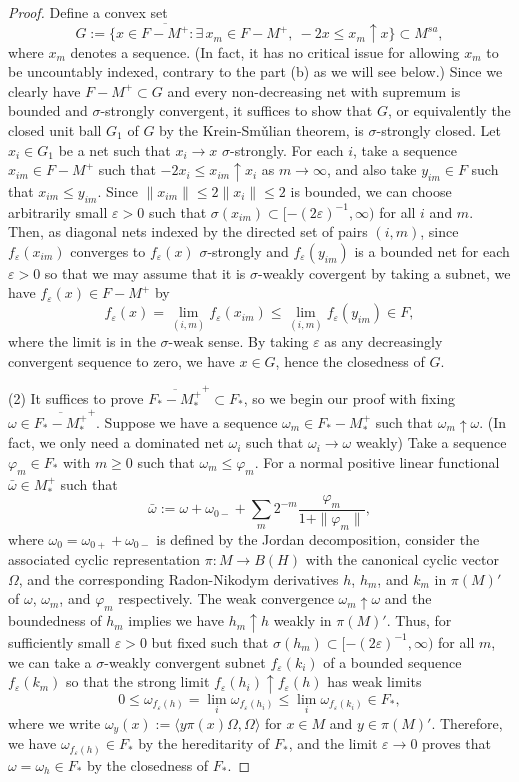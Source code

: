 \documentclass[a4paper]{amsart}
\newcommand{\e}{\varepsilon}
\theoremstyle{plain}
\theoremstyle{definition}
\begin{document}
\begin{proof}
Define a convex set
\[G:=\{x\in\overline{F-M^+}:\exists\,x_m\in F-M^+,\ -2x\le x_m\uparrow x\}\subset M^{sa},\]
where $x_m$ denotes a sequence.
(In fact, it has no critical issue for allowing $x_m$ to be uncountably indexed, contrary to the part (b) as we will see below.)
Since we clearly have $F-M^+\subset G$ and every non-decreasing net with supremum is bounded and $\sigma$-strongly convergent, it suffices to show that $G$, or equivalently the closed unit ball $G_1$ of $G$ by the Krein-Sm\v ulian theorem, is $\sigma$-strongly closed.
Let $x_i\in G_1$ be a net such that $x_i\to x$ $\sigma$-strongly.
For each $i$, take a sequence $x_{im}\in F-M^+$ such that $-2x_i\le x_{im}\uparrow x_i$ as $m\to\infty$, and also take $y_{im}\in F$ such that $x_{im}\le y_{im}$.
Since $\|x_{im}\|\le2\|x_i\|\le2$ is bounded, we can choose arbitrarily small $\e>0$ such that $\sigma(x_{im})\subset[-(2\e)^{-1},\infty)$ for all $i$ and $m$.
Then, as diagonal nets indexed by the directed set of pairs $(i,m)$, since $f_\e(x_{im})$ converges to $f_\e(x)$ $\sigma$-strongly and $f_\e(y_{im})$ is a bounded net for each $\e>0$ so that we may assume that it is $\sigma$-weakly covergent by taking a subnet, we have $f_\e(x)\in F-M^+$ by
\[f_\e(x)=\lim_{(i,m)}f_\e(x_{im})\le\lim_{(i,m)}f_\e(y_{im})\in F,\]
where the limit is in the $\sigma$-weak sense.
By taking $\e$ as any decreasingly convergent sequence to zero, we have $x\in G$, hence the closedness of $G$.


(2)
It suffices to prove $\overline{F_*-M_*^+}^+\subset F_*$, so we begin our proof with fixing $\omega\in\overline{F_*-M_*^+}^+$.
Suppose we have a sequence $\omega_m\in F_*-M_*^+$ such that $\omega_m\uparrow\omega$. (In fact, we only need a dominated net $\omega_i$ such that $\omega_i\to\omega$ weakly)
Take a sequence $\varphi_m\in F_*$ with $m\ge0$ such that $\omega_m\le\varphi_m$.
For a normal positive linear functional $\bar\omega\in M_*^+$ such that
\[\bar\omega:=\omega+\omega_{0-}+\sum_m2^{-m}\frac{\varphi_m}{1+\|\varphi_m\|},\]
where $\omega_0=\omega_{0+}+\omega_{0-}$ is defined by the Jordan decomposition, consider the associated cyclic representation $\pi:M\to B(H)$ with the canonical cyclic vector $\Omega$, and the corresponding Radon-Nikodym derivatives $h$, $h_m$, and $k_m$ in $\pi(M)'$ of $\omega$, $\omega_m$, and $\varphi_m$ respectively.
The weak convergence $\omega_m\uparrow\omega$ and the boundedness of $h_m$ implies we have $h_m\uparrow h$ weakly in $\pi(M)'$.
Thus, for sufficiently small $\e>0$ but fixed such that $\sigma(h_m)\subset[-(2\e)^{-1},\infty)$ for all $m$, we can take a $\sigma$-weakly convergent subnet $f_\e(k_i)$ of a bounded sequence $f_\e(k_m)$ so that the strong limit $f_\e(h_i)\uparrow f_\e(h)$ has weak limits
\[0\le\omega_{f_\e(h)}=\lim_i\omega_{f_\e(h_i)}\le\lim_i\omega_{f_\e(k_i)}\in F_*,\]
where we write $\omega_y(x):=\langle y\pi(x)\Omega,\Omega\rangle$ for $x\in M$ and $y\in\pi(M)'$.
Therefore, we have $\omega_{f_\e(h)}\in F_*$ by the hereditarity of $F_*$, and the limit $\e\to0$ proves that $\omega=\omega_h\in F_*$ by the closedness of $F_*$.


\end{proof}
\end{document}
